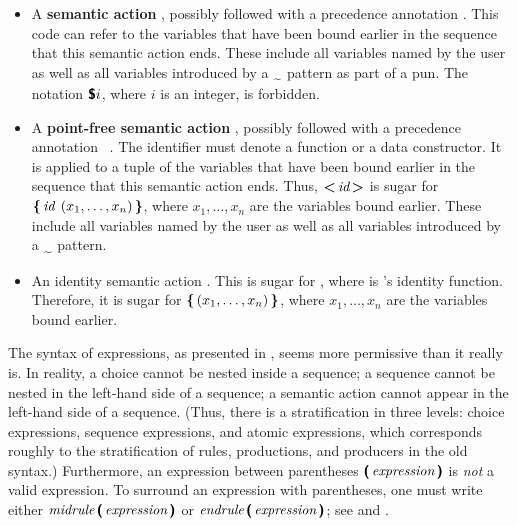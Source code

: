\documentclass[onecolumn,11pt,nocopyrightspace,preprint]{sigplanconf}
\begin{document}
\begin{itemize}
\item
  A \textbf{semantic action} \daction,
  possibly followed with a precedence annotation \dprec {}.
  This \ocaml code can refer to the variables that have been bound
  earlier in the sequence that this semantic action ends.
  These include all variables named by the user as well as all
  variables introduced by a $\dtilde$ pattern as part of a pun.
  The notation $\text{\upshape\sf\bfseries \$}i$, where $i$ is an integer, is forbidden.

\item
  A \textbf{point-free semantic action} ,
  possibly followed with a precedence annotation \dprec~.
  The \ocaml identifier  must denote a function or a data
  constructor. It is applied to a tuple of the variables that have
  been bound earlier in the sequence that this semantic action ends.
  Thus, $\text{\upshape\sf\bfseries <} \,\textit{id}\, \text{\upshape\sf\bfseries >}$ is sugar for
  $\text{\upshape\sf\bfseries \{} \,\textit{id}\;\,(x_1, \ldots, x_n)\, \text{\upshape\sf\bfseries \}}$,
  where $x_1, \ldots, x_n$ are the variables bound earlier.
  These include all variables named by the user as well as all
  variables introduced by a $\dtilde$ pattern.

\item
  An identity semantic action \dpfidentityaction. This is sugar for
  , where  is \ocaml's
  identity function.
  Therefore, it is sugar for
  $\text{\upshape\sf\bfseries \{} \,(x_1, \ldots, x_n)\, \text{\upshape\sf\bfseries \}}$,
  where $x_1, \ldots, x_n$ are the variables bound earlier.
\end{itemize}

\begin{comment}
To some degree, an expression is analogous to an \ocaml expression: it returns
an \ocaml value, and as a side effect, recognizes and consumes a fragment of
the input. In particular, a sequence
%
\pattern \dequal \expressionsub{1} \dsemi \expressionsub{2}
%
is roughly analogous to an \ocaml sequence \verb+let p = e1 in e2+.
\end{comment}

The syntax of expressions, as presented in , seems more
permissive than it really is. In reality, a choice cannot be nested inside a
sequence;
a sequence cannot be nested in the left-hand side of a sequence; a semantic
action cannot appear in the left-hand side of a sequence. (Thus, there is a
stratification in three levels: choice expressions, sequence expressions, and
atomic expressions, which corresponds roughly to the stratification of rules,
productions, and producers in the old syntax.)
%
Furthermore, an expression between parentheses
$\text{\upshape\sf\bfseries (}\, \textit{expression} \,\text{\upshape\sf\bfseries )}$ is \emph{not} a valid expression.
To surround an expression with parentheses, one must write either
$\textit{midrule}\, \text{\upshape\sf\bfseries (}\, \textit{expression} \,\text{\upshape\sf\bfseries )}$ or
$\textit{endrule}\, \text{\upshape\sf\bfseries (}\, \textit{expression} \,\text{\upshape\sf\bfseries )}$;
see  and .
\end{document}
